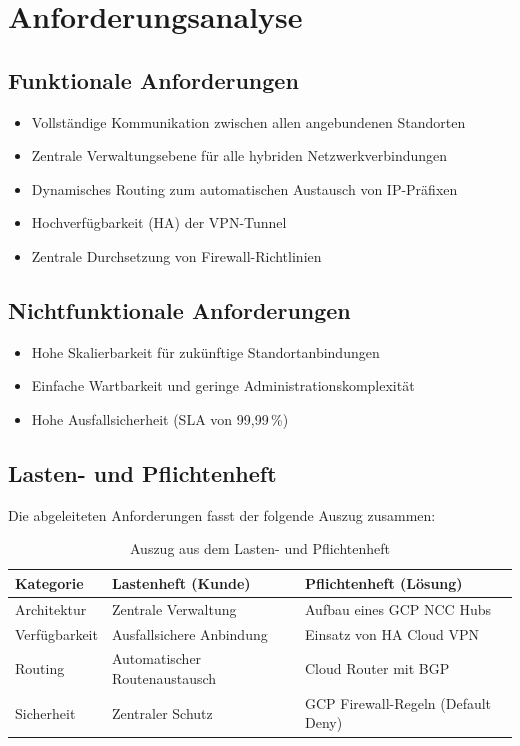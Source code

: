 \section{Anforderungsanalyse}

\subsection*{Funktionale Anforderungen}
\begin{itemize}
    \item Vollständige Kommunikation zwischen allen angebundenen Standorten
    \item Zentrale Verwaltungsebene für alle hybriden Netzwerkverbindungen
    \item Dynamisches Routing zum automatischen Austausch von IP-Präfixen
    \item Hochverfügbarkeit (HA) der VPN-Tunnel
    \item Zentrale Durchsetzung von Firewall-Richtlinien
\end{itemize}

\subsection*{Nichtfunktionale Anforderungen}
\begin{itemize}
    \item Hohe Skalierbarkeit für zukünftige Standortanbindungen
    \item Einfache Wartbarkeit und geringe Administrationskomplexität
    \item Hohe Ausfallsicherheit (SLA von 99,99\,\%)
\end{itemize}

\subsection{Lasten- und Pflichtenheft}
Die abgeleiteten Anforderungen fasst der folgende Auszug zusammen:

\begin{table}[!ht]
\centering
\begin{tabularx}{\textwidth}{|l|X|X|}
\hline
\textbf{Kategorie} & \textbf{Lastenheft (Kunde)} & \textbf{Pflichtenheft (Lösung)} \\ \hline
Architektur & Zentrale Verwaltung & Aufbau eines GCP NCC Hubs \\ \hline
Verfügbarkeit & Ausfallsichere Anbindung & Einsatz von HA Cloud VPN \\ \hline
Routing & Automatischer Routenaustausch & Cloud Router mit BGP \\ \hline
Sicherheit & Zentraler Schutz & GCP Firewall-Regeln (Default Deny) \\ \hline
\end{tabularx}
\caption{Auszug aus dem Lasten- und Pflichtenheft}
\end{table}

